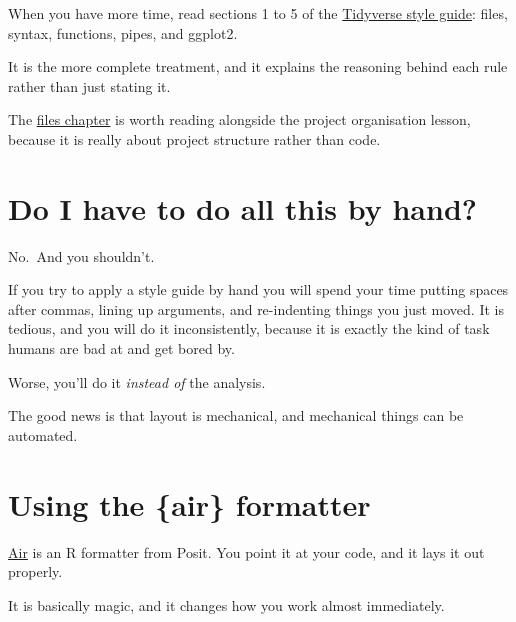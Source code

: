 \documentclass[
  letterpaper,
  justified,
  a4paper]{tufte-book}
\begin{document}
\begin{tcolorbox}[enhanced jigsaw, arc=.35mm, bottomrule=.15mm, bottomtitle=1mm, breakable, colback=white, colbacktitle=quarto-callout-tip-color!10!white, colframe=quarto-callout-tip-color-frame, coltitle=black, left=2mm, leftrule=.75mm, opacityback=0, opacitybacktitle=0.6, rightrule=.15mm, title=\textcolor{quarto-callout-tip-color}{\faLightbulb}\hspace{0.5em}{Going deeper}, titlerule=0mm, toprule=.15mm, toptitle=1mm]

When you have more time, read sections 1 to 5 of the
\href{https://style.tidyverse.org/}{Tidyverse style guide}: files,
syntax, functions, pipes, and ggplot2.

It is the more complete treatment, and it explains the reasoning behind
each rule rather than just stating it.

The \href{https://style.tidyverse.org/files.html}{files chapter} is
worth reading alongside the project organisation lesson, because it is
really about project structure rather than code.

\end{tcolorbox}

\section{Do I have to do all this by
hand?}\label{do-i-have-to-do-all-this-by-hand}

No.~And you shouldn't.

If you try to apply a style guide by hand you will spend your time
putting spaces after commas, lining up arguments, and re-indenting
things you just moved. It is tedious, and you will do it inconsistently,
because it is exactly the kind of task humans are bad at and get bored
by.

Worse, you'll do it \emph{instead of} the analysis.

The good news is that layout is mechanical, and mechanical things can be
automated.

\section{Using the \{air\} formatter}\label{using-the-air-formatter}

\href{https://posit-dev.github.io/air/}{Air} is an R formatter from
Posit. You point it at your code, and it lays it out properly.

It is basically magic, and it changes how you work almost immediately.
\end{document}
